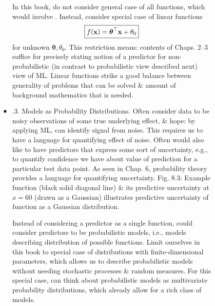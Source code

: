 \documentclass{article}
\begin{document}
\begin{enumerate}
\begin{itemize}
\begin{itemize}
\begin{itemize}
				In this book, do not consider general case of all functions, which would involve . Instead, consider special case of linear functions
				\begin{equation}
					\boxed{f({\bf x}) = \boldsymbol{\theta}^\top{\bf x} + \theta_0}
				\end{equation}
				for unknown $\boldsymbol{\theta},\theta_0$. This restriction means: contents of Chaps. 2--3 suffice for precisely stating notion of a predictor for non-probabilistic (in contrast to probabilistic view described next) view of ML. Linear functions strike a good balance between generality of problems that can be solved \& amount of background mathematics that is needed.
				\item {.3. Models as Probability Distributions.} Often consider data to be noisy observations of some true underlying effect, \& hope: by applying ML, can identify signal from noise. This requires us to have a language for quantifying effect of noise. Often would also like to have predictors that express some sort of uncertainty, e.g., to quantify confidence we have about value of prediction for a particular test data point. As seen in Chap. 6, probability theory provides a language for quantifying uncertainty. {\sf Fig. 8.3: Example function (black solid diagonal line) \& its predictive uncertainty at $x = 60$ (drawn as a Gaussian)} illustrates predictive uncertainty of function as a Gaussian distribution.
				
				Instead of considering a predictor as a single function, could consider predictors to be probabilistic models, i.e., models describing distribution of possible functions. Limit ourselves in this book to special case of distributions with finite-dimensional parameters, which allows us to describe probabilistic models without needing stochastic processes \& random measures. For this special case, can think about probabilistic models as multivariate probability distributions, which already allow for a rich class of models.
				

\end{itemize}
\end{itemize}
\end{itemize}
\end{enumerate}
\end{document}
